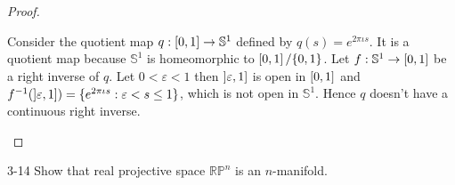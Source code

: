 \begin{proof}
\begin{enumerate}[label={(\alph*)}]
              Consider the quotient map $q: \left[{0, 1}\right]\to \mathbb{S}^{1}$ defined by $q(s) = e^{2\pi\iota s}$. It is a quotient map because $\mathbb{S}^{1}$ is homeomorphic to $\left[{0, 1}\right]/\{ 0, 1 \}$. Let $f: \mathbb{S}^{1}\to \left[{0, 1}\right]$ be a right inverse of $q$. Let $0 < \varepsilon < 1$ then $\left]{\varepsilon, 1}\right]$ is open in $\left[{0, 1}\right]$ and $f^{-1}(\left]{\varepsilon, 1}\right]) = \{ e^{2\pi\iota s}: \varepsilon < s \leq 1 \}$, which is not open in $\mathbb{S}^{1}$. Hence $q$ doesn't have a continuous right inverse.
    \end{enumerate}
\end{proof}

\begin{problem}{3-14}\label{problem:3-14}
Show that real projective space $\mathbb{RP}^{n}$ is an $n$-manifold.
\end{problem}

